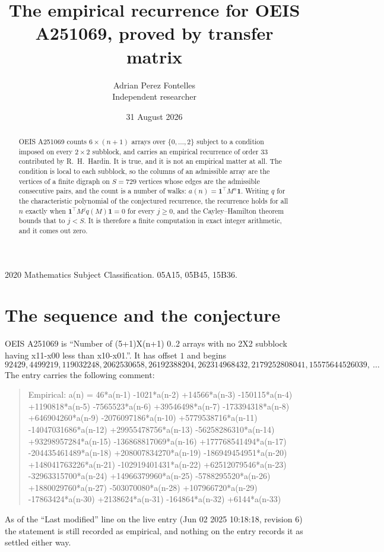 \documentclass[11pt,a4paper]{article}
\title{The empirical recurrence for OEIS A251069, proved by transfer matrix}
\author{Adrian Perez Fontelles\\ \small Independent researcher}
\date{31 August 2026}
\theoremstyle{plain}
\theoremstyle{definition}
\begin{document}
\maketitle

\begin{abstract}
OEIS A251069 counts $6\times(n+1)$ arrays over $\{0,\dots,2\}$ subject to a condition imposed on
every $2\times2$ subblock, and carries an empirical recurrence of order $33$ contributed
by R.~H.~Hardin. It is true, and it is not an empirical matter at all. The condition is local
to each subblock, so the columns of an admissible array are the vertices of a finite digraph
on $S=729$ vertices whose edges are the admissible consecutive pairs, and the count is a
number of walks: $a(n)=\mathbf{1}^{\!\top}M^{n}\mathbf{1}$. Writing $q$
for the characteristic polynomial of the conjectured recurrence, the recurrence holds for all
$n$ exactly when $\mathbf{1}^{\!\top}M^{j}q(M)\mathbf{1}=0$ for every $j\ge0$, and the
Cayley--Hamilton theorem bounds that to $j<S$. It is therefore a finite computation in exact
integer arithmetic, and it comes out zero.
\end{abstract}

\noindent\small 2020 Mathematics Subject Classification. 05A15, 05B45, 15B36.\normalsize

\section{The sequence and the conjecture}

OEIS A251069 is ``Number of (5+1)X(n+1) 0..2 arrays with no 2X2 subblock having x11-x00 less than x10-x01.''. It has offset $1$ and begins
\[
92429, 4499219, 119032248, 2062530658, 26192388204, 262314968432, 2179252808041, 15575644526039,\ \dots
\]
The entry carries the following comment:
\begin{quote}\small
Empirical: a(n) = 46*a(n-1) -1021*a(n-2) +14566*a(n-3) -150115*a(n-4) +1190818*a(n-5) -7565523*a(n-6) +39546498*a(n-7) -173394318*a(n-8) +646904260*a(n-9) -2076097186*a(n-10) +5779538716*a(n-11) -14047031686*a(n-12) +29955478756*a(n-13) -56258286310*a(n-14) +93298957284*a(n-15) -136868817069*a(n-16) +177768541494*a(n-17) -204435461489*a(n-18) +208007834270*a(n-19) -186949454951*a(n-20) +148041763226*a(n-21) -102919401431*a(n-22) +62512079546*a(n-23) -32963315700*a(n-24) +14966379960*a(n-25) -5788295520*a(n-26) +1880029760*a(n-27) -503070080*a(n-28) +107966720*a(n-29) -17863424*a(n-30) +2138624*a(n-31) -164864*a(n-32) +6144*a(n-33)
\end{quote}
As of the ``Last modified'' line on the live entry (Jun 02 2025 10:18:18, revision 6) the statement is
still recorded as empirical, and nothing on the entry records it as settled either way.
\end{document}
